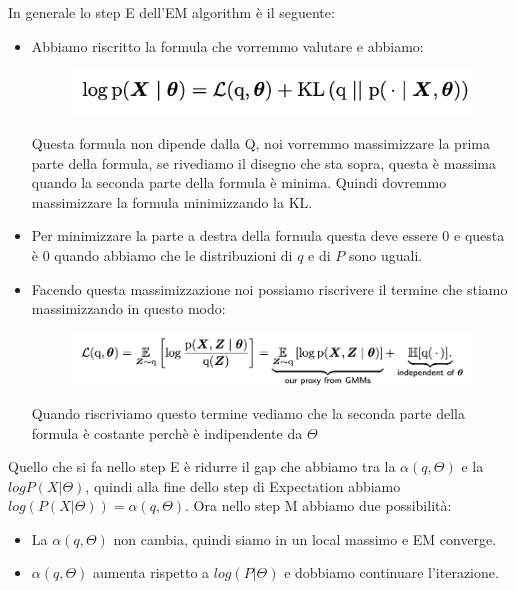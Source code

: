\documentclass[14pt]{extreport}
\begin{document}
In generale lo step E dell'EM algorithm è il seguente:

\begin{itemize}
	\item Abbiamo riscritto la formula che vorremmo valutare e abbiamo:

	      \begin{figure}[H]
		      \centering
		      \includegraphics[width=0.7\linewidth]{565.jpeg}
	      \end{figure}

	      Questa formula non dipende dalla Q, noi vorremmo massimizzare la prima parte della formula, se rivediamo il disegno che sta sopra, questa è
	      massima quando la seconda parte della formula è minima. Quindi dovremmo massimizzare la formula minimizzando la KL.
	\item Per minimizzare la parte a destra della formula questa deve essere 0 e questa è 0 quando abbiamo che le distribuzioni di $q$ e di $P$ sono
	uguali.
	\item Facendo questa massimizzazione noi possiamo riscrivere il termine che stiamo massimizzando in questo modo:

	      \begin{figure}[H]
		      \centering
		      \includegraphics[width=0.7\linewidth]{566.jpeg}
	      \end{figure}

	      Quando riscriviamo questo termine vediamo che la seconda parte della formula è costante perchè è indipendente da $\Theta$

\end{itemize}

Quello che si fa nello step E è ridurre il gap che abbiamo tra la $\alpha(q,\Theta)$ e la $log P(X|\Theta)$, quindi alla fine dello step di
Expectation abbiamo $log(P(X|\Theta)) = \alpha(q,\Theta)$. Ora nello step M abbiamo due possibilità:
\begin{itemize}
	\item La $\alpha(q, \Theta)$ non cambia, quindi siamo in un local massimo e EM converge.
	\item $\alpha(q, \Theta)$ aumenta rispetto a $log(P|\Theta)$ e dobbiamo continuare l'iterazione.
\end{itemize}
\end{document}
